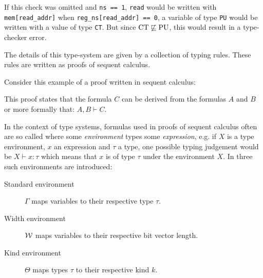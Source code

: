 \begin{example}
    If this check was omitted and \lstinline{ns == 1}, \lstinline{read} would be written with \lstinline{mem[read_addr]} when \lstinline{reg_ns[read_addr] == 0}, a variable of type \lstinline{PU} would be written with a value of type \lstinline{CT}.
    But since $ \CT \not \sqsubseteq \PU $, this would result in a type-checker error.
\end{example}

The details of this type-system are given by a collection of typing rules.
These rules are written as proofs of sequent calculus.

\begin{example}
    Consider this example of a proof written in sequent calculus:
    \begin{prooftree}
    \end{prooftree}

    This proof states that the formula $ C $ can be derived from the formulas $ A $ and $ B $ or more formally that: $ A, B \vdash C $.
\end{example}

In the context of type systems, formulas used in proofs of sequent calculus often are so called  where some \textit{environment} types some \textit{expression}, e.g. if $ X $ is a type environment, $ x $ an expression and $ \tau $ a type, one possible typing judgement would be $ X \vdash x : \tau $ which means that $ x $ is of type $ \tau $ under the environment $ X $.
In \cite{Ferraiuolo17} three such environments are introduced:

\begin{description}
    \item[Standard environment] $ \Gamma $ maps variables to their respective type $ \tau $.
    \item[Width environment] $ \W $ maps variables to their respective bit vector length.
    \item[Kind environment] $ \Theta $ maps types $ \tau $ to their respective kind $ k $.
\end{description}

